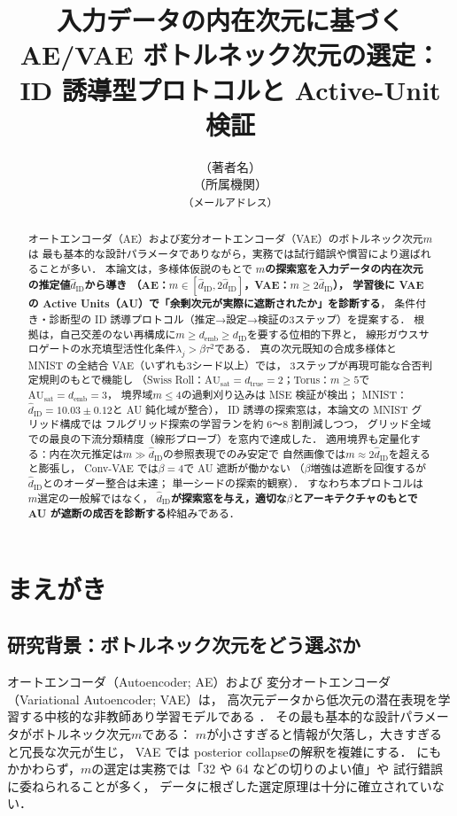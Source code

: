 \documentclass[11pt,a4paper]{jsarticle}
\title{入力データの内在次元に基づく AE/VAE ボトルネック次元の選定：\\
ID 誘導型プロトコルと Active-Unit 検証}
\author{（著者名）\\
{\small （所属機関）}\\
{\small \texttt{（メールアドレス）}}}
\date{}
\newcommand{\dID}{d_{\mathrm{ID}}}
\newcommand{\hatdID}{\hat{d}_{\mathrm{ID}}}
\newcommand{\dtrue}{d_{\mathrm{true}}}
\newcommand{\AUsat}{\mathrm{AU}_{\mathrm{sat}}}
\newcommand{\demb}{d_{\mathrm{emb}}}
\begin{document}
\maketitle

\begin{abstract}
オートエンコーダ（AE）および変分オートエンコーダ（VAE）のボトルネック次元$m$は
最も基本的な設計パラメータでありながら，実務では試行錯誤や慣習により選ばれることが多い．
本論文は，多様体仮説のもとで
\textbf{$m$の探索窓を入力データの内在次元の推定値$\hatdID$から導き
（AE：$m \in [\hatdID, 2\hatdID]$，VAE：$m \geq 2\hatdID$），
学習後に VAE の Active Units（AU）で「余剰次元が実際に遮断されたか」を診断する}，
条件付き・診断型の ID 誘導プロトコル（推定→設定→検証の3ステップ）を提案する．
根拠は，自己交差のない再構成に$m \geq \demb \geq \dID$を要する位相的下界と，
線形ガウスサロゲートの水充填型活性化条件$\lambda_j > \beta\tau^2$である．
真の次元既知の合成多様体と MNIST の全結合 VAE（いずれも3シード以上）では，
3ステップが再現可能な合否判定規則のもとで機能し
（Swiss Roll：$\AUsat = \dtrue = 2$；Torus：$m \geq 5$で$\AUsat = \demb = 3$，
境界域$m \leq 4$の過剰刈り込みは MSE 検証が検出；
MNIST：$\hatdID = 10.03 \pm 0.12$と AU 鈍化域が整合），
ID 誘導の探索窓は，本論文の MNIST グリッド構成では
フルグリッド探索の学習ランを約 6〜8 割削減しつつ，
グリッド全域での最良の下流分類精度（線形プローブ）を窓内で達成した．
適用境界も定量化する：内在次元推定は$m \gg \hatdID$の参照表現でのみ安定で
自然画像では$m \approx 2\hatdID$を超えると膨張し，
Conv-VAE では$\beta = 4$で AU 遮断が働かない
（$\beta$増強は遮断を回復するが$\hatdID$とのオーダー整合は未達；
単一シードの探索的観察）．
すなわち本プロトコルは$m$選定の一般解ではなく，
\textbf{$\hatdID$が探索窓を与え，適切な$\beta$とアーキテクチャのもとで
AU が遮断の成否を診断する}枠組みである．
\end{abstract}

\section{まえがき}\label{sec:intro}

\subsection{研究背景：ボトルネック次元をどう選ぶか}\label{sec:intro_bg}

オートエンコーダ（Autoencoder; AE）および
変分オートエンコーダ（Variational Autoencoder; VAE）\cite{kingma2014vae}は，
高次元データから低次元の潜在表現を学習する中核的な非教師あり学習モデルである
\cite{bengio2013representation}．
その最も基本的な設計パラメータがボトルネック次元$m$である：
$m$が小さすぎると情報が欠落し，大きすぎると冗長な次元が生じ，
VAE では posterior collapse\cite{lucas2019elbo}の解釈を複雑にする．
にもかかわらず，$m$の選定は実務では「32 や 64 などの切りのよい値」や
試行錯誤に委ねられることが多く，
データに根ざした選定原理は十分に確立されていない．
\end{document}
